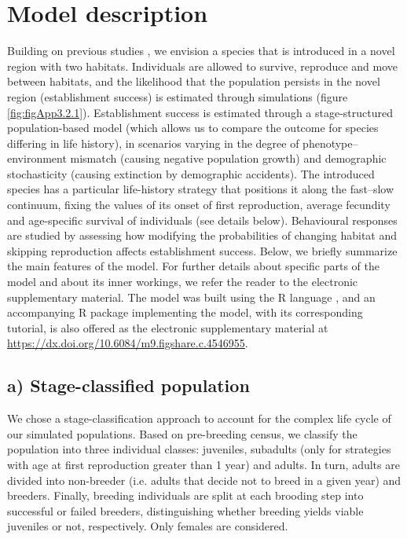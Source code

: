 \section{Model description}

Building on previous studies \citep{Cressman2013, kawecki1995demography}, we envision a species
that is introduced in a novel region with two habitats.
Individuals are allowed to survive, reproduce and move
between habitats, and the likelihood that the population persists
in the novel region (establishment success) is estimated
through simulations (figure
\ref{fig:figApp3.2.1}). Establishment success is estimated through a
stage-structured population-based model (which allows us
to compare the outcome for species differing in life history),
in scenarios varying in the degree of phenotype–environment
mismatch (causing negative population growth) and
demographic stochasticity (causing extinction by demographic
accidents). The introduced species has a particular
life-history strategy that positions it along the fast–slow continuum,
fixing the values of its onset of first reproduction,
average fecundity and age-specific survival of individuals
(see details below). Behavioural responses are studied by
assessing how modifying the probabilities of changing habitat
and skipping reproduction affects establishment success.
Below, we briefly summarize the main features of the
model. For further details about specific parts of the model
and about its inner workings, we refer the reader to the electronic
supplementary material. The model was built using
the R language \citep{RCoreTeam}, and an accompanying R package implementing
the model, with its corresponding tutorial, is also
offered as the electronic supplementary material at
\url{https://dx.doi.org/10.6084/m9.figshare.c.4546955}.


\subsection*{a) Stage-classified population}

We chose a stage-classification approach to account for the
complex life cycle of our simulated populations. Based on
pre-breeding census, we classify the population into three individual
classes: juveniles, subadults (only for strategies with age
at first reproduction greater than 1 year) and adults. In turn,
adults are divided into non-breeder (i.e. adults that decide
not to breed in a given year) and breeders. Finally, breeding
individuals are split at each brooding step into successful or
failed breeders, distinguishing whether breeding yields viable
juveniles or not, respectively. Only females are considered.


